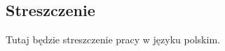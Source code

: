 
\vspace*{2cm}
\begin{addmargin}[1em]{1em}%
\hspace{8mm}
\begin{center}
\subsection*{Streszczenie}
\end{center}
Tutaj będzie streszczenie pracy w języku polskim. 
\end{addmargin}
\vspace{2cm}
\clearpage